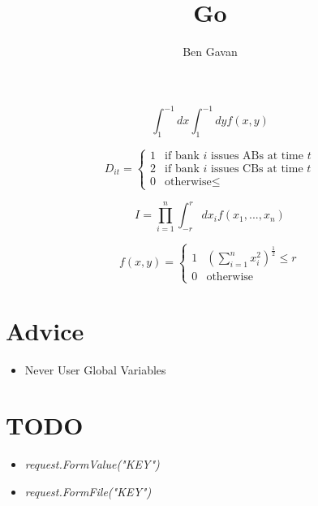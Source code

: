 \documentclass[]{article}
\title{Go}
\author{Ben Gavan}
\renewcommand{\it}[1]{\textit{#1}}
\begin{document}
\maketitle
\tableofcontents

\begin{abstract}

\end{abstract}

\begin{equation}
	\int_{1}^{-1} dx \int_{1}^{-1} dy f(x,y)
\end{equation}

\begin{equation}
D_{it} =
\begin{cases}
1 & \text{if bank $i$ issues ABs at time $t$}\\
2 & \text{if bank $i$ issues CBs at time $t$}\\
0 & \text{otherwise} \leq
\end{cases}       
\end{equation}

\begin{equation}
	I = \prod_{i = 1}^{n} \int_{-r}^{r} dx_i f(x_1, ..., x_n)
\end{equation}

\begin{equation}
f(x,y) =
\begin{cases}
1 &  \left( \sum_{i = 1}^{n} x_i^2 \right)^\frac{1}{2} \leq r\\
0 & \text{otherwise}
\end{cases}       
\end{equation}

\section{Advice} 
\begin{itemize}
	\item Never User Global Variables
\end{itemize}

\section{TODO}
\begin{itemize}
	\item \it{request.FormValue("KEY")}
	\item \it{request.FormFile("KEY")}
\end{itemize}
\end{document}

